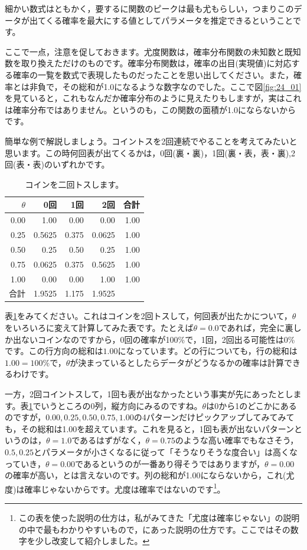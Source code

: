 \documentclass{ltjsbook}
\begin{document}
細かい数式はともかく，要するに関数のピークは最も尤もらしい，つまりこのデータが出てくる確率を最大にする値としてパラメータを推定できるということです。

ここで一点，注意を促しておきます。尤度関数は，確率分布関数の未知数と既知数を取り換えただけのものです。確率分布関数は，確率の出目(実現値)に対応する確率の一覧を数式で表現したものだったことを思い出してください。また，確率とは非負で，その総和が1.0になるような数字なのでした。ここで図\ref{fig:24_01}を見ていると，これもなんだか確率分布のように見えたりもしますが，実はこれは確率分布ではありません。というのも，この関数の面積が1.0にならないからです。

簡単な例で解説しましょう。コイントスを2回連続でやることを考えてみたいと思います。この時何回表が出てくるかは，0回(裏・裏)，1回(裏・表，表・裏),2回(表・表)のいずれかです。

\begin{table}[ht]
	\centering
	\caption{コインを二回トスします。}
	\begin{tabular}{rrrrr}
		\hline
		$\theta$ & 0回     & 1回    & 2回     & 合計   \\
		\hline
		0.00     & 1.00   & 0.00  & 0.00   & 1.00 \\
		0.25     & 0.5625 & 0.375 & 0.0625 & 1.00 \\
		0.50     & 0.25   & 0.50  & 0.25   & 1.00 \\
		0.75     & 0.0625 & 0.375 & 0.5625 & 1.00 \\
		1.00     & 0.00   & 0.00  & 1.00   & 1.00 \\
		\hline
		合計       & 1.9525 & 1.175 & 1.9525 &      \\
		\hline
	\end{tabular}
	\label{tbl::24_01}
\end{table}

表\ref{tbl::24_01}をみてください。これはコインを2回トスして，何回表が出たかについて，$\theta$をいろいろに変えて計算してみた表です。たとえば$\theta=0.0$であれば，完全に裏しか出ないコインなのですから，0回の確率が100\%で，1回，2回出る可能性は0\%です。この行方向の総和は$1.00$になっています。どの行についても，行の総和は$1.00=100\%$で，$\theta$が決まっているとしたらデータがどうなるかの確率は計算できるわけです。

一方，2回コイントスして，1回も表が出なかったという事実が先にあったとします。表\ref{tbl::24_01}でいうところの0列，縦方向にみるのですね。$\theta$は0から1のどこかにあるのですが，$0.00,0.25,0.50,0.75,1.00$の4パターンだけピックアップしてみてみても，その総和は1.00を超えています。これを見ると，1回も表が出ないパターンというのは，$\theta=1.0$であるはずがなく，$\theta=0.75$のような高い確率でもなさそう，$0.5,0.25$とパラメータが小さくなるに従って「そうなりそうな度合い」は高くなっていき，$\theta=0.00$であるというのが一番あり得そうではありますが，$\theta=0.00$の確率が高い，とは言えないのです。列の総和が1.00にならないから，これ(尤度)は確率じゃないからです。尤度は確率ではないのです\footnote{この表を使った説明の仕方は，私がみてきた「尤度は確率じゃない」の説明の中で最もわかりやすいもので，\textcite{lambert2018student}にあった説明の仕方です。ここではその数字を少し改変して紹介しました。}。
\end{document}
